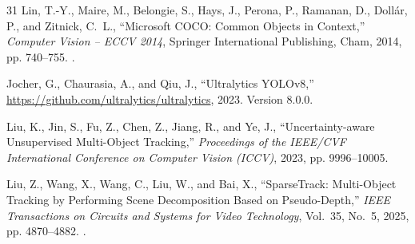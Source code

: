 \documentclass[journal]{new-aiaa}
\begin{document}
\begin{thebibliography}{31}
Lin, T.-Y., Maire, M., Belongie, S., Hays, J., Perona, P., Ramanan, D.,
  Doll{\'a}r, P., and Zitnick, C.~L., \enquote{{Microsoft COCO: Common Objects
  in Context},} \emph{Computer Vision -- ECCV 2014}, Springer International
  Publishing, Cham, 2014, pp. 740--755.
\newblock {}.

Jocher, G., Chaurasia, A., and Qiu, J., \enquote{{Ultralytics YOLOv8},}
  \url{https://github.com/ultralytics/ultralytics}, 2023.
\newblock Version 8.0.0.

Liu, K., Jin, S., Fu, Z., Chen, Z., Jiang, R., and Ye, J.,
  \enquote{{Uncertainty-aware Unsupervised Multi-Object Tracking},}
  \emph{Proceedings of the IEEE/CVF International Conference on Computer Vision
  (ICCV)}, 2023, pp. 9996--10005.

Liu, Z., Wang, X., Wang, C., Liu, W., and Bai, X., \enquote{{SparseTrack:
  Multi-Object Tracking by Performing Scene Decomposition Based on
  Pseudo-Depth},} \emph{IEEE Transactions on Circuits and Systems for Video
  Technology}, Vol.~35, No.~5, 2025, pp. 4870--4882.
\newblock {}.

\end{thebibliography}
\end{document}

